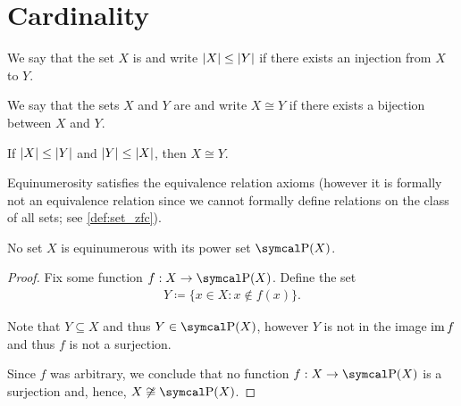 \section{Cardinality}\label{sec:cardinality}

\begin{definition}\label{def:set_domination}\cite[145]{Enderton1977}
  We say that the set $X$ is  and write $\left\vert X \right\vert \leq \left\vert Y \right\vert$ if there exists an injection from $X$ to $Y$.
\end{definition}

\begin{definition}\label{def:equinumerous_sets}\cite[129]{Enderton1977}
  We say that the sets $X$ and $Y$ are  and write $X \cong Y$ if there exists a bijection between $X$ and $Y$.
\end{definition}

\begin{theorem}\label{thm:cantor_schroder_bernstein}\cite[147]{Enderton1977}
  If $\left\vert X \right\vert \leq \left\vert Y \right\vert$ and $\left\vert Y \right\vert \leq \left\vert X \right\vert$, then $X \cong Y$.
\end{theorem}

\begin{proposition}\label{thm:equinumerousity_equivalence}\cite[theorem 6A]{Enderton1977}
  Equinumerosity satisfies the equivalence relation axioms (however it is formally not an equivalence relation since we cannot formally define relations on the class of all sets; see \cref{def:set_zfc}).
\end{proposition}

\begin{theorem}[Cantor]\label{thm:cantor_power_set_theorem}\cite[theorem 6B]{Enderton1977}
  No set $X$ is equinumerous with its power set $\Power(X)$.
\end{theorem}
\begin{proof}
  Fix some function $f: X \to \Power(X)$. Define the set
  \begin{align*}
    Y \coloneqq \{ x \in X \colon x \not\in f(x) \}.
  \end{align*}

  Note that $Y \subseteq X$ and thus $Y \in \Power(X)$, however $Y$ is not in the image $\operatorname{im} f$ and thus $f$ is not a surjection.

  Since $f$ was arbitrary, we conclude that no function $f: X \to \Power(X)$ is a surjection and, hence, $X \not\cong \Power(X)$.
\end{proof}

